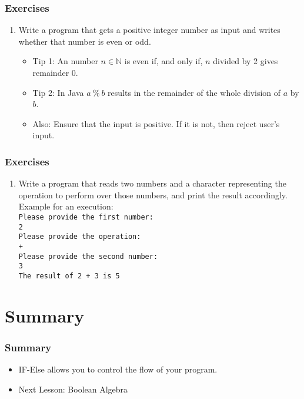 \documentclass{beamer}
\begin{document}
	\begin{frame}
		\frametitle{Exercises}
		\begin{enumerate}[2]
			\item Write a program that gets a positive integer number as input and writes whether that number is even or odd.
			\begin{itemize}
				\item Tip 1: An number $n \in \mathbb{N}$ is even if, and only if, $n$ divided by 2 gives remainder 0.
				\item Tip 2: In Java $a\ \%\ b$ results in the remainder of the whole division of $a$ by $b$.
				\item Also: Ensure that the input is positive. If it is not, then reject user's input.
			\end{itemize}
		\end{enumerate}
	\end{frame}

	\begin{frame}
	\frametitle{Exercises}
	\begin{enumerate}[3]
		\item Write a program that reads two numbers and a character representing the operation to perform over those numbers, and print the result accordingly. Example for an execution:\\
		\vskip20pt
		\texttt{Please provide the first number:}\\
		\texttt{2}\\
		\texttt{Please provide the operation: }\\
		\texttt{+}\\
		\texttt{Please provide the second number: }\\
		\texttt{3}\\
		\texttt{The result of 2 + 3 is 5}\\
	\end{enumerate}
	\end{frame}
		
	\section{Summary}
	
	\begin{frame}
		\frametitle{Summary}
		\begin{itemize}
			\item IF-Else allows you to control the flow of your program.
			\item Next Lesson: Boolean Algebra
		\end{itemize}
	\end{frame}
\end{document}
